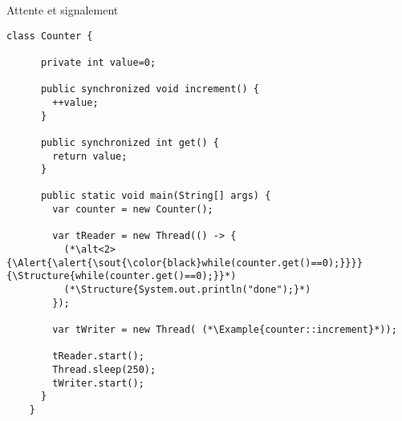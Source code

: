 
\begingroup

\begin{frame}[fragile]{Attente et signalement}

  \begin{lstlisting}[gobble=4]
    class Counter {
      
      private int value=0;
      
      public synchronized void increment() {
        ++value;
      }
      
      public synchronized int get() {
        return value;
      }

      public static void main(String[] args) {
        var counter = new Counter();
        
        var tReader = new Thread(() -> {
          (*\alt<2>{\Alert{\alert{\sout{\color{black}while(counter.get()==0);}}}}{\Structure{while(counter.get()==0);}}*)
          (*\Structure{System.out.println("done");}*)
        });

        var tWriter = new Thread( (*\Example{counter::increment}*));

        tReader.start();
        Thread.sleep(250);
        tWriter.start();
      }
    }
  \end{lstlisting}


\end{frame}

\endgroup
\endinput
